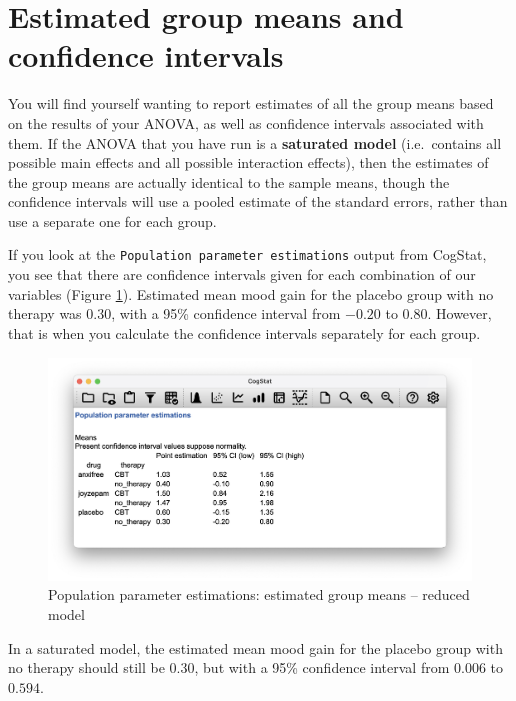 \documentclass[
]{book}
\theoremstyle{definition}
\theoremstyle{definition}
\theoremstyle{definition}
\theoremstyle{definition}
\theoremstyle{remark}
\begin{document}
\hypertarget{meansfactorialanova}{%
\section{Estimated group means and confidence intervals}\label{meansfactorialanova}}

You will find yourself wanting to report estimates of all the group means based on the results of your ANOVA, as well as confidence intervals associated with them. If the ANOVA that you have run is a \textbf{saturated model} (i.e.~contains all possible main effects and all possible interaction effects), then the estimates of the group means are actually identical to the sample means, though the confidence intervals will use a pooled estimate of the standard errors, rather than use a separate one for each group.

If you look at the \texttt{Population\ parameter\ estimations} output from CogStat, you see that there are confidence intervals given for each combination of our variables (Figure \ref{fig:cogstatafci}). Estimated mean mood gain for the placebo group with no therapy was \(0.30\), with a 95\% confidence interval from \(-0.20\) to \(0.80\). However, that is when you calculate the confidence intervals separately for each group.

\begin{figure}

{\centering \includegraphics[width=0.66\linewidth]{resources/image/cogstatafci} 

}

\caption{Population parameter estimations: estimated group means -- reduced model}\label{fig:cogstatafci}
\end{figure}

In a saturated model, the estimated mean mood gain for the placebo group with no therapy should still be \(0.30\), but with a 95\% confidence interval from \(0.006\) to \(0.594\).
\end{document}
